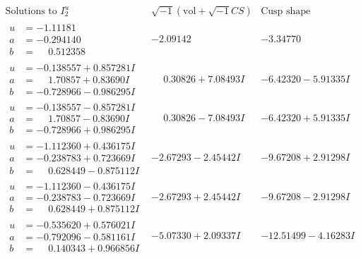 \documentclass[1p]{elsarticle_modified}
\theoremstyle{definition}
\newcommand{\I}{\sqrt{-1}}
\begin{document}
$$\begin{array}{c|c|c}  
\text{Solutions to }I^u_{2}& \I (\text{vol} + \sqrt{-1}CS) & \text{Cusp shape}\\
 \hline 
\begin{aligned}
u &= -1.11181\phantom{ +0.000000I} \\
a &= -0.294140\phantom{ +0.000000I} \\
b &= \phantom{-}0.512358\phantom{ +0.000000I}\end{aligned}
 & -2.09142\phantom{ +0.000000I} & -3.34770\phantom{ +0.000000I} \\ \hline\begin{aligned}
u &= -0.138557 + 0.857281 I \\
a &= \phantom{-}1.70857 + 0.83690 I \\
b &= -0.728966 - 0.986295 I\end{aligned}
 & \phantom{-}0.30826 + 7.08493 I & -6.42320 - 5.91335 I \\ \hline\begin{aligned}
u &= -0.138557 - 0.857281 I \\
a &= \phantom{-}1.70857 - 0.83690 I \\
b &= -0.728966 + 0.986295 I\end{aligned}
 & \phantom{-}0.30826 - 7.08493 I & -6.42320 + 5.91335 I \\ \hline\begin{aligned}
u &= -1.112360 + 0.436175 I \\
a &= -0.238783 + 0.723669 I \\
b &= \phantom{-}0.628449 - 0.875112 I\end{aligned}
 & -2.67293 - 2.45442 I & -9.67208 + 2.91298 I \\ \hline\begin{aligned}
u &= -1.112360 - 0.436175 I \\
a &= -0.238783 - 0.723669 I \\
b &= \phantom{-}0.628449 + 0.875112 I\end{aligned}
 & -2.67293 + 2.45442 I & -9.67208 - 2.91298 I \\ \hline\begin{aligned}
u &= -0.535620 + 0.576021 I \\
a &= -0.792096 - 0.581161 I \\
b &= \phantom{-}0.140343 + 0.966856 I\end{aligned}
 & -5.07330 + 2.09337 I & -12.51499 - 4.16283 I \\ \hline\begin{aligned}

\end{aligned}
\end{array}$$
\end{document}
